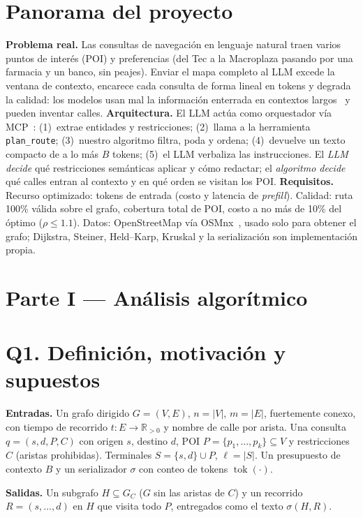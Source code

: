\documentclass[conference,10pt]{IEEEtran}
\newcommand{\tok}{\operatorname{tok}}
\newcommand{\Sterm}{S}
\begin{document}
\section{Panorama del proyecto}
\textbf{Problema real.} Las consultas de navegación en lenguaje natural traen varios puntos de interés (POI) y preferencias (\guillemotleft{}del Tec a la Macroplaza pasando por una farmacia y un banco, sin peajes\guillemotright{}). Enviar el mapa completo al LLM excede la ventana de contexto, encarece cada consulta de forma lineal en tokens y degrada la calidad: los modelos usan mal la información enterrada en contextos largos~\cite{liu2024lost} y pueden inventar calles.
\textbf{Arquitectura.} El LLM actúa como orquestador vía MCP~\cite{mcp2024}: (1)~extrae entidades y restricciones; (2)~llama a la herramienta \texttt{plan\_route}; (3)~nuestro algoritmo filtra, poda y ordena; (4)~devuelve un texto compacto de a lo más $B$ tokens; (5)~el LLM verbaliza las instrucciones. El \emph{LLM decide} qué restricciones semánticas aplicar y cómo redactar; el \emph{algoritmo decide} qué calles entran al contexto y en qué orden se visitan los POI.
\textbf{Requisitos.} Recurso optimizado: tokens de entrada (costo y latencia de \emph{prefill}). Calidad: ruta 100\% válida sobre el grafo, cobertura total de POI, costo a no más de 10\% del óptimo ($\rho\le 1.1$). Datos: OpenStreetMap vía OSMnx~\cite{boeing2017}, usado solo para obtener el grafo; Dijkstra, Steiner, Held--Karp, Kruskal y la serialización son implementación propia.

\section*{Parte I --- Análisis algorítmico}

\section{Q1. Definición, motivación y supuestos}
\textbf{Entradas.} Un grafo dirigido $G=(V,E)$, $n=|V|$, $m=|E|$, fuertemente conexo, con tiempo de recorrido $t:E\to\mathbb{R}_{>0}$ y nombre de calle por arista. Una consulta $q=(s,d,P,C)$ con origen $s$, destino $d$, POI $P=\{p_1,\dots,p_k\}\subseteq V$ y restricciones $C$ (aristas prohibidas). Terminales $\Sterm=\{s,d\}\cup P$, $\ell=|\Sterm|$. Un presupuesto de contexto $B$ y un serializador $\sigma$ con conteo de tokens $\tok(\cdot)$.

\textbf{Salidas.} Un subgrafo $H\subseteq G_C$ ($G$ sin las aristas de $C$) y un recorrido $R=(s,\dots,d)$ en $H$ que visita todo $P$, entregados como el texto $\sigma(H,R)$.
\end{document}

